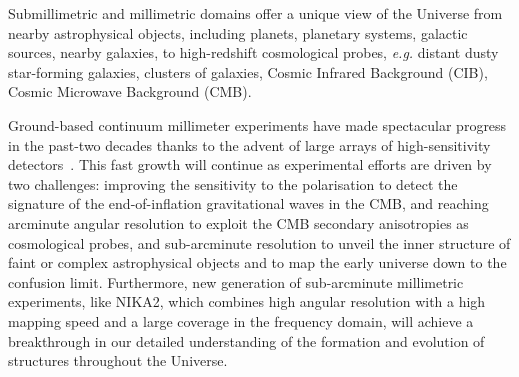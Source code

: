 %

Submillimetric and millimetric domains offer a unique view of the
Universe from nearby astrophysical objects, including planets,
planetary systems, galactic sources, nearby galaxies, to high-redshift
cosmological probes, \emph{e.g.} distant dusty star-forming galaxies,
clusters of galaxies, Cosmic Infrared Background (CIB), Cosmic Microwave
Background (CMB).

Ground-based {\lp continuum} millimeter experiments have made spectacular progress in
the past-two decades thanks to the advent of large arrays of
high-sensitivity detectors~\citep{Wilson2008_AZTEC,
  Siringo2009_LABOCA, Swetz2011_ACT, Bleem2012_SPT, Monfardini2011_NIKA, Holland2013_SCUBA2,
  Dicker2014_MUSTANG2, Adam2017}. %
This fast growth will continue as experimental efforts are
driven by two challenges: improving the sensitivity to the
polarisation to detect the signature of
the end-of-inflation gravitational waves in the CMB, and reaching
arcminute angular resolution to exploit the CMB secondary anisotropies
as cosmological probes, and sub-arcminute resolution to unveil the
inner structure of faint or complex astrophysical objects and to map
the early universe down to the confusion limit. Furthermore, new
generation of sub-arcminute millimetric experiments, like NIKA2, which
combines high angular resolution with a high mapping speed and a large
coverage in the frequency domain, will achieve a breakthrough in 
our detailed understanding of the formation and evolution of
structures throughout the Universe.

